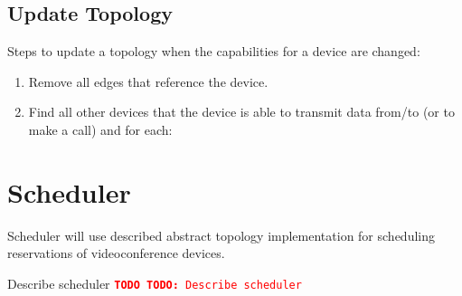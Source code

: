 \documentclass[a4paper]{report}
\newcommand{\TODO}[1]{%
\def\empty{}%
\def\prvniparametr{#1}%
\ifx\prvniparametr\empty%
\begingroup\tt\textcolor{red}{\noindent\textbf{TODO}}\endgroup
\else%
\begingroup\tt\textcolor{red}{\noindent\textbf{TODO:}\ #1}\endgroup
\fi%
}
\begin{document}
\section{Update Topology}     

Steps to update a topology when the capabilities for a device are changed:
\begin{enumerate}

\item Remove all edges that reference the device.

\item Find all other devices that the device is able to transmit data from/to
   (or to make a call) and for each:

\end{enumerate}  


\chapter{Scheduler}

Scheduler will use described abstract topology implementation for scheduling reservations of videoconference devices.

\TODO{Describe scheduler}
\end{document}
